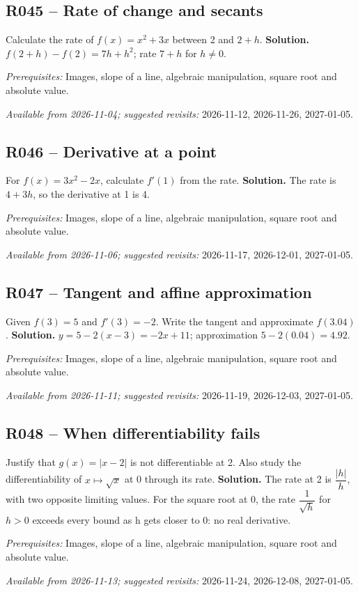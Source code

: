 \subsection*{R045 -- Rate of change and secants}\label{R045}
Calculate the rate of $f(x)=x^2+3x$ between 2 and $2+h$.
\ifprof\textbf{Solution.} $f(2+h)-f(2)=7h+h^2$; rate $7+h$ for $h\ne0$.\par\textit{Prerequisites:} Images, slope of a line, algebraic manipulation, square root and absolute value.\par\textit{Available from 2026-11-04; suggested revisits:} 2026-11-12, 2026-11-26, 2027-01-05.\fi
{}\subsection*{R046 -- Derivative at a point}\label{R046}
For $f(x)=3x^2-2x$, calculate $f\prime(1)$ from the rate.
\ifprof\textbf{Solution.} The rate is $4+3h$, so the derivative at 1 is 4.\par\textit{Prerequisites:} Images, slope of a line, algebraic manipulation, square root and absolute value.\par\textit{Available from 2026-11-06; suggested revisits:} 2026-11-17, 2026-12-01, 2027-01-05.\fi
{}\subsection*{R047 -- Tangent and affine approximation}\label{R047}
Given $f(3)=5$ and $f\prime(3)=-2$. Write the tangent and approximate $f(3.04)$.
\ifprof\textbf{Solution.} $y=5-2(x-3)=-2x+11$; approximation $5-2(0.04)=4.92$.\par\textit{Prerequisites:} Images, slope of a line, algebraic manipulation, square root and absolute value.\par\textit{Available from 2026-11-11; suggested revisits:} 2026-11-19, 2026-12-03, 2027-01-05.\fi
{}\subsection*{R048 -- When differentiability fails}\label{R048}
Justify that $g(x)=|x-2|$ is not differentiable at 2. Also study the differentiability of $x\mapsto\sqrt{x}$ at 0 through its rate.
\ifprof\textbf{Solution.} The rate at 2 is $\dfrac{|h|}{h}$, with two opposite limiting values. For the square root at 0, the rate $\dfrac{1}{\sqrt h}$ for $h>0$ exceeds every bound as h gets closer to 0: no real derivative.\par\textit{Prerequisites:} Images, slope of a line, algebraic manipulation, square root and absolute value.\par\textit{Available from 2026-11-13; suggested revisits:} 2026-11-24, 2026-12-08, 2027-01-05.\fi
